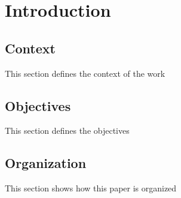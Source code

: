 \chapter{Introduction}
 
 

\section{Context}

This section defines the context of the work

\section{Objectives}

This section defines the objectives

\section{Organization}

This section shows how this paper is organized
 
